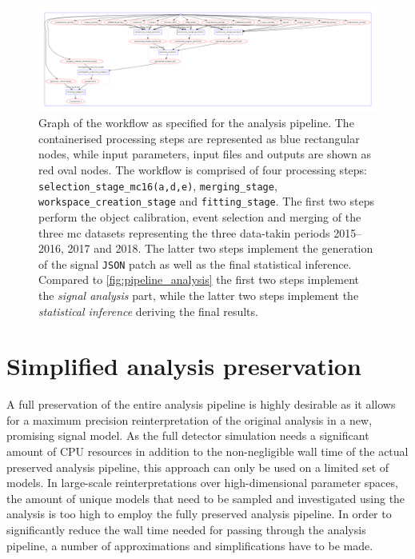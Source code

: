  \begin{figure}
	\centering\includegraphics[width=\textwidth]{yadage_workflow_instance}
	\caption{Graph of the workflow as specified for the analysis pipeline. The containerised processing steps are represented as blue rectangular nodes, while input parameters, input files and outputs are shown as red oval nodes. The workflow is comprised of four processing steps: \texttt{selection\_stage\_mc16(a,d,e)}, \texttt{merging\_stage}, \texttt{workspace\_creation\_stage} and \texttt{fitting\_stage}. The first two steps perform the object calibration, event selection and merging of the three \gls{mc} datasets representing the three data-takin periods 2015--2016, 2017 and 2018. The latter two steps implement the generation of the signal \texttt{JSON} patch as well as the final statistical inference. Compared to \cref{fig:pipeline_analysis} the first two steps implement the \textit{signal analysis} part, while the latter two steps implement the \textit{statistical inference} deriving the final results.} 
	\label{fig:recast_workflow}
\end{figure}

\section{Simplified analysis preservation}\label{sec:simplified_preservation}

A full preservation of the entire analysis pipeline is highly desirable as it allows for a maximum precision reinterpretation of the original analysis in a new, promising signal model. As the full detector simulation needs a significant amount of CPU resources in addition to the non-negligible wall time of the actual preserved analysis pipeline, this approach can only be used on a limited set of models. In large-scale reinterpretations over high-dimensional parameter spaces, the amount of unique models that need to be sampled and investigated using the analysis is too high to employ the fully preserved analysis pipeline. In order to significantly reduce the wall time needed for passing through the analysis pipeline, a number of approximations and simplifications have to be made. 


